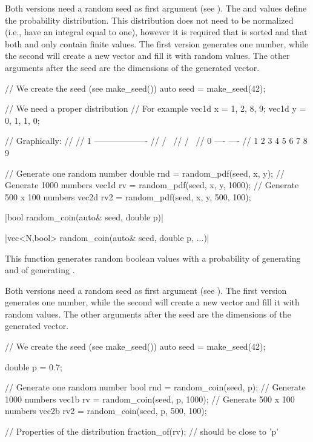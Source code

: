 Both versions need a random seed as first argument (see ). The  and  values define the probability distribution. This distribution does not need to be normalized (i.e., have an integral equal to one), however it is required that  is sorted and that both  and  only contain finite values. The first version generates one number, while the second will create a new vector and fill it with random values. The other arguments after the seed are the dimensions of the generated vector.

\begin{example}
\begin{cppcode}
// We create the seed (see make_seed())
auto seed = make_seed(42);

// We need a proper distribution
// For example
vec1d x = {1, 2, 8, 9};
vec1d y = {0, 1, 1, 0};

// Graphically:
//
// 1       -------------------
//        /                   \
//       /                     \
// 0 ----                       ----
//      1  2  3  4  5  6  7  8  9

// Generate one random number
double rnd = random_pdf(seed, x, y);
// Generate 1000 numbers
vec1d rv = random_pdf(seed, x, y, 1000);
// Generate 500 x 100 numbers
vec2d rv2 = random_pdf(seed, x, y, 500, 100);
\end{cppcode}
\end{example}

\funcitem \cppinline|bool random_coin(auto& seed, double p)| 

\cppinline|vec<N,bool> random_coin(auto& seed, double p, ...)|

This function generates random boolean values with a probability  of generating  and  of generating .

Both versions need a random seed as first argument (see \cppinline{make_seed()}). The first version generates one number, while the second will create a new vector and fill it with random values. The other arguments after the seed are the dimensions of the generated vector.

\begin{example}
\begin{cppcode}
// We create the seed (see make_seed())
auto seed = make_seed(42);

double p = 0.7;

// Generate one random number
bool rnd = random_coin(seed, p);
// Generate 1000 numbers
vec1b rv = random_coin(seed, p, 1000);
// Generate 500 x 100 numbers
vec2b rv2 = random_coin(seed, p, 500, 100);

// Properties of the distribution
fraction_of(rv); // should be close to 'p'
\end{cppcode}
\end{example}


